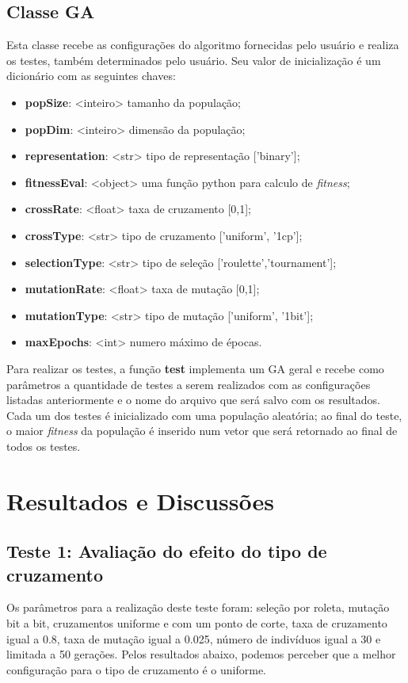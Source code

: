 \documentclass[11pt,a4paper]{article}
\begin{document}
\subsection{Classe GA}
Esta classe recebe as configurações do algoritmo fornecidas pelo usuário e realiza os testes, também determinados pelo usuário. Seu valor de inicialização é um dicionário com as seguintes chaves:
\begin{itemize}
\footnotesize
\setlength\itemsep{0em}
\item \textbf{popSize}: <inteiro> tamanho da população;
\item \textbf{popDim}: <inteiro> dimensão da população;
\item \textbf{representation}: <str> tipo de representação ['binary'];
\item \textbf{fitnessEval}: <object> uma função python para calculo de \textit{fitness};
\item \textbf{crossRate}: <float> taxa de cruzamento [0,1];
\item \textbf{crossType}: <str> tipo de cruzamento ['uniform', '1cp'];
\item \textbf{selectionType}: <str> tipo de seleção ['roulette','tournament'];
\item \textbf{mutationRate}: <float> taxa de mutação [0,1];
\item \textbf{mutationType}: <str> tipo de mutação ['uniform', '1bit'];
\item \textbf{maxEpochs}: <int> numero máximo de épocas.
\end{itemize}

Para realizar os testes, a função \textbf{test} implementa um GA geral e recebe como parâmetros a quantidade de testes a serem realizados com as configurações listadas anteriormente e o nome do arquivo que será salvo com os resultados. Cada um dos testes é inicializado com uma população aleatória; ao final do teste, o maior \textit{fitness} da população é inserido num vetor que será retornado ao final de todos os testes.

\section{Resultados e Discussões}
\subsection{Teste 1: Avaliação do efeito do tipo de cruzamento}
Os parâmetros para a realização deste teste foram: seleção por roleta, mutação bit a bit, cruzamentos uniforme e com um ponto de corte, taxa de cruzamento igual a 0.8, taxa de mutação igual a 0.025, número de indivíduos igual a 30 e limitada a 50 gerações. Pelos resultados abaixo, podemos perceber que a melhor configuração para o tipo de cruzamento é o uniforme.\\
\end{document}
